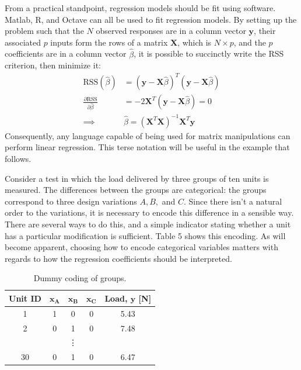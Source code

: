 \documentclass[11pt,a4paper,article]{memoir} %
\begin{document}
From a practical standpoint, regression models should be fit using software. Matlab, R, and Octave can all be used to fit regression models. By setting up the problem such that the $N$ observed responses are in a column vector $\mathbf{y}$, their associated $p$ inputs form the rows of a matrix $\mathbf{X}$, which is $N \times p$, and the $p$ coefficients are in a column vector $\hat{\beta}$, it is possible to succinctly write the RSS criterion, then minimize it:
\begin{align}
	\text{RSS}(\hat{\beta}) &= (\mathbf{y - X}\hat{\beta})^T(\mathbf{y - X}\hat{\beta}) \\
	\frac{\partial \text{RSS}}{\partial \hat{\beta}} &= -2\mathbf{X}^T(\mathbf{y - X}\hat{\beta}) = 0 \\
	\implies &\hat{\beta} = (\mathbf{X}^T\mathbf{X})^{-1}\mathbf{X}^T \mathbf{y} \label{eq:normal_eqtn}
\end{align}
Consequently, any language capable of being used for matrix manipulations can perform linear regression. This terse notation will be useful in the example that follows.

Consider a test in which the load delivered by three groups of ten units is measured. The differences between the groups are categorical: the groups correspond to three design variations $A, B,$ and $C$. Since there isn't a natural order to the variations, it is necessary to encode this difference in a sensible way. There are several ways to do this, and a simple indicator stating whether a unit has a particular modification is sufficient. Table 5 shows this encoding. As will become apparent, choosing how to encode categorical variables matters with regards to how the regression coefficients should be interpreted.
\begin{table}
\centering
\caption{Dummy coding of groups.}
\small
\begin{tabular}{c c c c c}
\toprule
\textbf{Unit ID}                 & $\mathbf{x_A}$ & $\mathbf{x_B}$ & $\mathbf{x_C}$ & \textbf{Load, $\mathbf{y}$ [N]} \\
\midrule
1                       & 1 & 0 & 0 & 5.43         \\
2                       & 0 & 1 & 0 & 7.48         \\ 
& & \vdots & & \\
30 & 0 & 1 & 0 & 6.47 \\
\bottomrule
\end{tabular}
\end{table}
\end{document}
